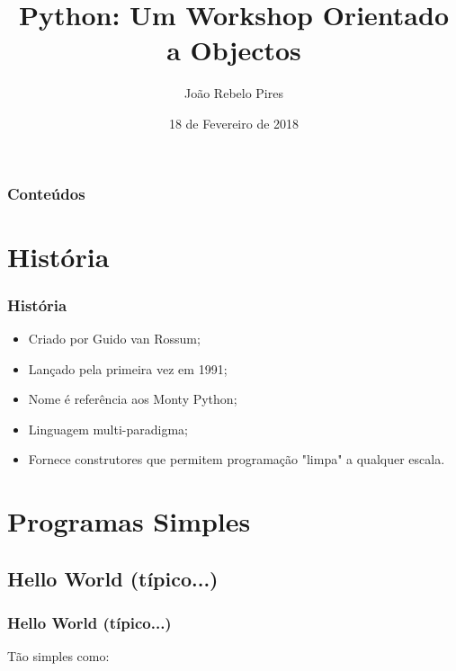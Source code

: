 \documentclass{beamer}
\author{João Rebelo Pires}
\institute[DCC]{NUCC-FCUP (DCC)}
\title[Python com Class]{Python: Um Workshop Orientado a Objectos}
\date{18 de Fevereiro de 2018}
\begin{document}
	\begin{frame}
		\titlepage
	\end{frame}
	
	\begin{frame}
		\frametitle{Conteúdos}
		\tableofcontents
	\end{frame}
	
	\section{História}
	\begin{frame}
		\frametitle{História}
		\begin{itemize}
			\item Criado por Guido van Rossum; \pause
			\item Lançado pela primeira vez em 1991; \pause
			\item Nome é referência aos Monty Python; \pause
			\item Linguagem multi-paradigma; \pause
			\item Fornece construtores que permitem programação "limpa" a qualquer escala.
		\end{itemize}
	\end{frame}
	
	\section{Programas Simples}
	\subsection*{Hello World (típico...)}
	\begin{frame}[fragile]
		\frametitle{Hello World (típico...)}
		Tão simples como:
		\vspace{10pt}
		\inputminted{python}{helloWorld.py}
	\end{frame}
	
\end{document}
